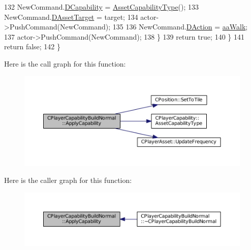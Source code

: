 \begin{DoxyCode}
132             NewCommand.\hyperlink{structSAssetCommand_a734ea7c6847457b437360f333f570ff9}{DCapability} = \hyperlink{classCPlayerCapability_a433bb196cd6ab6a932f1cac102b3aa98}{AssetCapabilityType}();
133             NewCommand.\hyperlink{structSAssetCommand_a3d9b43f6e59c386c48c41a65448a0c39}{DAssetTarget} = target;
134             actor->PushCommand(NewCommand);
135             
136             NewCommand.\hyperlink{structSAssetCommand_a8edd3b3d59a76d5514ba403bc8076a75}{DAction} = \hyperlink{GameDataTypes_8h_ab47668e651a3032cfb9c40ea2d60d670a60ca9010aa62b73c1aab838ff4bf7276}{aaWalk};
137             actor->PushCommand(NewCommand);
138         \}
139         \textcolor{keywordflow}{return} \textcolor{keyword}{true};
140     \}
141     \textcolor{keywordflow}{return} \textcolor{keyword}{false};
142 \}
\end{DoxyCode}
Here is the call graph for this function\+:
\nopagebreak
\begin{figure}[H]
\begin{center}
\leavevmode
\includegraphics[width=350pt]{classCPlayerCapabilityBuildNormal_afc2fbda17580385a4028d44cd03c9149_cgraph}
\end{center}
\end{figure}
Here is the caller graph for this function\+:
\nopagebreak
\begin{figure}[H]
\begin{center}
\leavevmode
\includegraphics[width=350pt]{classCPlayerCapabilityBuildNormal_afc2fbda17580385a4028d44cd03c9149_icgraph}
\end{center}
\end{figure}
\hypertarget{classCPlayerCapabilityBuildNormal_a1a8c6fdd9d8a91ecb7417163279e2276}{}\label{classCPlayerCapabilityBuildNormal_a1a8c6fdd9d8a91ecb7417163279e2276} 
